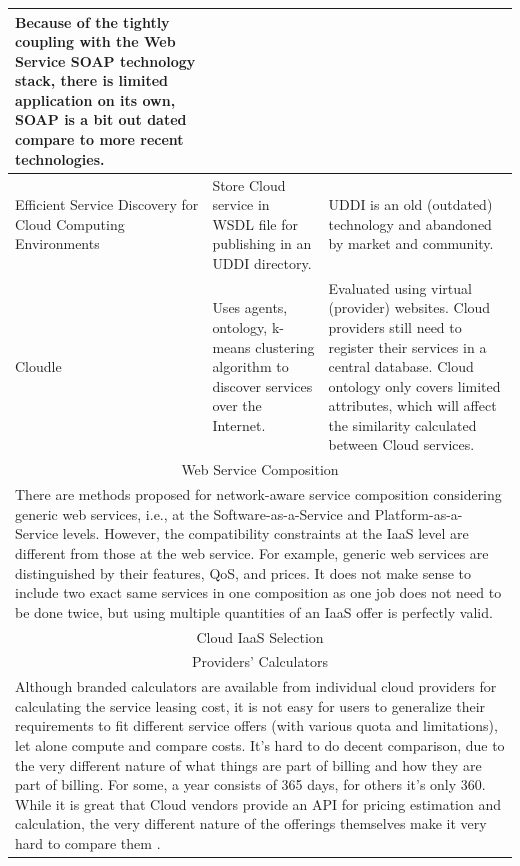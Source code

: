 \begin{longtable}{ p{30mm} | p{50mm} | p{50mm} }
    Because of the tightly coupling with the Web Service SOAP technology stack, there is limited application on its own, SOAP is a bit out dated compare to more recent technologies. \\
\hline   
    Efficient Service Discovery for Cloud Computing Environments
    \cite{EfficientServiceDiscoveryforCloudComputingEnvironments} & 
    Store Cloud service in WSDL file for publishing in an UDDI directory.& 
    UDDI is an old (outdated) technology and abandoned by market and community.\\ 
\hline
	Cloudle \cite{Cloudle, CloudleAgent-BasedCloudComputing} & 
    Uses agents, ontology, k-means clustering algorithm to discover services over the Internet. & 
    Evaluated using virtual (provider) websites. 
    Cloud providers still need to register their services in a central database.
    Cloud ontology only covers limited attributes,
    which will affect the similarity calculated between Cloud services.\\ 
\hline
\multicolumn{3}{c}{ \cellcolor{yellow} Web Service Composition}\\
\hline
\multicolumn{3}{p{140mm}}{There are methods proposed for network-aware service composition
\cite{Yu2007, Benatallah2004, Zheng2013}
considering generic web services, i.e., at the
Software-as-a-Service and Platform-as-a-Service levels. However,
the compatibility constraints at the IaaS level are different
from those at the web service. For example, generic web
services are distinguished by their features, QoS, and prices.
It does not make sense to include two exact same services in
one composition as one job does not need to be done twice, but
using multiple quantities of an IaaS offer is perfectly valid.}\\
\hline
\multicolumn{3}{c}{ \cellcolor{yellow} Cloud IaaS Selection}\\
\hline
\multicolumn{3}{c}{Providers' Calculators}\\
\hline
\multicolumn{3}{p{140mm}}{Although branded calculators are available from individual cloud providers
\cite{AWSCalculator, AzurePricingCalculator, GooglePricingCalculator, RackspaceCalculator, SoftLayerCalculator}
for calculating the service leasing cost, it is not easy for users to
generalize their requirements to fit different service offers (with
various quota and limitations), let alone compute and compare
costs. It's hard to do decent comparison, due to the very different nature of what things are part of billing and how they are part of billing. For some, a year consists of 365 days, for others it's only 360. While it is great that Cloud vendors provide an API for pricing estimation and calculation, the very different nature of the offerings themselves make it very hard to compare them \cite{Cloudorado}.}\\

\end{longtable}
